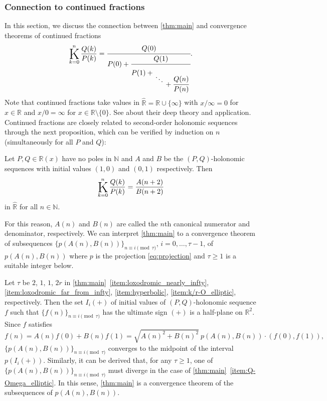 \documentclass[a4paper,UKenglish,cleveref,autoref,thm-restate]{lipics-v2021}
\newcommand{\R}{\mathbb{R}}
\newcommand{\N}{\mathbb{N}}
\newcommand\Kettenbruch{\operatornamewithlimits{\mathchoice
     {\vcenter{\hbox{\huge $\mathrm{K}$}}}
     {\vcenter{\hbox{\Large $\mathrm{K}$}}}
     {\mathrm{K}}
     {\mathrm{K}}}}
\begin{document}
\subsubsection{Connection to continued fractions}\label{sec:cfrac}

In this section, we discuss the connection between \cref{thm:main} and convergence theorems of continued fractions
\[
\Kettenbruch _{k=0}^n \frac{Q(k)}{P(k)} 
=
\cfrac{Q(0)}{
P(0) 
+
\cfrac{Q(1)}
{
P(1) + 
\genfrac{}{}{0pt}{0}{\vphantom{l}}{
\lower1ex\hbox{$\ddots$} 
\genfrac{}{}{0pt}{0}{}{
{} + \cfrac{Q(n)}{P(n)}
}
}
}
}.
\]
Note that continued fractions take values in $\hat{\R} = \R \cup \{ \infty \}$ with $x / \infty = 0$ for $x \in \R$ and $x / 0 = \infty$ for $x \in \R \setminus \{ 0 \}$. See \cite{LW08} about their deep theory and application. 
Continued fractions are closely related to second-order holonomic sequences through the next proposition, which can be verified by induction on $n$ (simultaneously for all $P$ and $Q$): 

\begin{proposition}\label{prop:cfrac-holonomic}
Let $P, Q \in \R(x)$ have no poles in $\N$ and $A$ and $B$ be the $(P, Q)$-holonomic sequences with initial values $(1, 0)$ and $(0, 1)$ respectively. Then  
\begin{equation}\label{eq:K=A/B}
\Kettenbruch _{k=0}^n \frac{Q(k)}{P(k)} = \frac{A(n+2)}{B(n+2)}
\end{equation}
in $\hat{\R}$ for all $n \in \N$.
\end{proposition}

For this reason, $A(n)$ and $B(n)$ are called the $n$th canonical numerator and denominator, respectively. We can interpret \cref{thm:main} to a convergence theorem of subsequences $\{ p(A(n), B(n)) \}_{n \equiv i \pmod{\tau}}$, $i=0, \dots, \tau-1$, of $p(A(n), B(n))$ where $p$ is the projection \eqref{eq:projection} and $\tau \geq 1$ is a suitable integer below. 

Let $\tau$ be $2$, $1$, $1$, $2r$ in \cref{thm:main}~\eqref{item:loxodromic_nearly_infty}, \eqref{item:loxodromic_far_from_infty}, \eqref{item:hyperbolic}, \eqref{item:k/r-O_elliptic}, respectively. Then the set $I_i(+)$ of initial values of $(P, Q)$-holonomic sequence $f$ such that $\{ f(n) \}_{n \equiv i \pmod{\tau}}$ has the ultimate sign $(+)$ is a half-plane on $\R^2$. 
Since $f$ satisfies
\begin{equation}\label{eq:f=f0w}
f(n) = A(n)f(0) + B(n)f(1) = \sqrt{A(n)^2 + B(n)^2} \ p(A(n), B(n)) \cdot (f(0), f(1)), 
\end{equation}
$\{ p(A(n), B(n)) \}_{n \equiv i \pmod{\tau}}$ converges to the midpoint of the interval $p(I_i(+))$. 
Similarly, it can be derived that, for any $\tau \geq 1$, one of $\{ p(A(n), B(n)) \}_{n \equiv i \pmod{\tau}}$ must diverge in the case of \cref{thm:main}~\eqref{item:Q-Omega_elliptic}. 
In this sense, \cref{thm:main} is a convergence theorem of the subsequences of $p(A(n), B(n))$. 
\end{document}
